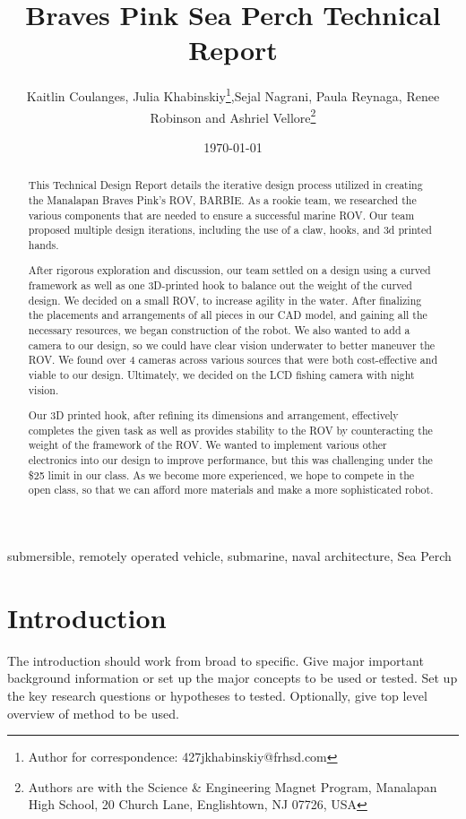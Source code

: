 \documentclass[10pt,draftcls,journal,onecolumn]{IEEEtran}
\title{Braves Pink Sea Perch Technical Report} %
\author{Kaitlin Coulanges, Julia Khabinskiy\thanks{Author for correspondence: 427jkhabinskiy@frhsd.com},Sejal Nagrani, Paula Reynaga, Renee Robinson and Ashriel Vellore\thanks{Authors are with the Science \& Engineering Magnet Program, Manalapan High School, 20 Church Lane, Englishtown, NJ 07726, USA}} %
\date{\today}
\newcommand{\keywords}{submersible, remotely operated vehicle, submarine, naval architecture, Sea Perch} %
\begin{document}
\linenumbers %
\maketitle

\begin{abstract}
This Technical Design Report details the iterative design process utilized in creating the Manalapan Braves Pink’s ROV, BARBIE. As a rookie team, we researched the various components that are needed to ensure a successful marine ROV. Our team proposed multiple design iterations, including the use of a claw, hooks, and 3d printed hands.

After rigorous exploration and discussion, our team settled on a design using a curved framework as well as one 3D-printed hook to balance out the weight of the curved design. We decided on a small ROV, to increase agility in the water. After finalizing the placements and arrangements of all pieces in our CAD model, and gaining all the necessary resources, we began construction of the robot. We also wanted to add a camera to our design, so we could have clear vision underwater to better maneuver the ROV. We found over 4 cameras across various sources that were both cost-effective and viable to our design. Ultimately, we decided on the LCD fishing camera with night vision.

Our 3D printed hook, after refining its dimensions and arrangement, effectively completes the given task as well as provides stability to the ROV by counteracting the weight of the framework of the ROV. We wanted to implement various other electronics into our design to improve performance, but this was challenging under the \$25 limit in our class. As we become more experienced, we hope to compete in the open class, so that we can afford more materials and make a more sophisticated robot.
\end{abstract}

\begin{IEEEkeywords}
\keywords
\end{IEEEkeywords}

\section{Introduction}
The introduction should work from broad to specific. Give major important background information or set up the major concepts to be used or tested. Set up the key research questions or hypotheses to tested. Optionally, give top level overview of method to be used. 
\end{document}
